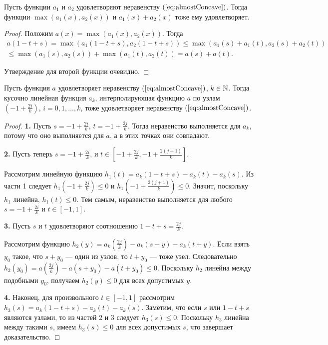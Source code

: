 \begin{lm}
\label{lm:weight_max_sum_concave}
Пусть функции $a_1$ и $a_2$ удовлетворяют неравенству $(\ref{eq:almostConcave})$.
Тогда функции $\max (a_1(x), a_2(x))$ и $a_1(x) + a_2(x)$ тоже ему удовлетворяет.
\end{lm}
\begin{proof}
Положим $a(x) = \max (a_1(x), a_2(x))$.
Тогда
\begin{multline*}
a(1 - t + s) = \max(a_1( 1 - t + s), a_2(1 - t + s)) \le
\max(a_1(s) + a_1(t), a_2(s) + a_2(t)) \\
\le \max(a_1(s), a_2(s)) + \max(a_1(t), a_2(t)) =
a(s) + a(t).
\end{multline*}

Утверждение для второй функции очевидно.
\end{proof}

\begin{lm}
\label{lm:weight_piecewise_linear_concave}
Пусть функция $a$ удовлетворяет неравенству $(\ref{eq:almostConcave})$, $k \in \mathbb N$.
Тогда кусочно линейная функция $a_k$, интерполирующая функцию $a$ по узлам
$(-1 + \frac{2i}{k})$, $i = 0, 1, \dots, k$, тоже удовлетворяет неравенству $(\ref{eq:almostConcave})$.
\end{lm}
\begin{proof}
\textbf{1.}
Пусть $s = -1 + \frac{2i}{k}$, $t = -1 + \frac{2j}{k}$.
Тогда неравенство выполняется для $a_k$, потому что оно выполняется для $a$,
а в этих точках они совпадают.

\textbf{2.}
Пусть теперь $s = -1 + \frac{2i}{k}$, и $t \in [-1 + \frac{2j}{k}, -1 + \frac{2(j + 1)}{k}]$.

Рассмотрим линейную функцию $h_1(t) = a_k( 1 - t + s ) - a_k(t) - a_k(s)$.
Из части 1 следует $h_1(-1 + \frac{2j}{k}) \le 0$ и $h_1(-1 + \frac{2(j + 1)}{k}) \le 0$.
Значит, поскольку $h_1$ линейна, $h_1(t) \le 0$.
Тем самым, неравенство выполняется для любого $s = -1 + \frac{2i}{k}$ и $t \in [-1, 1]$.

\textbf{3.}
Пусть $s$ и $t$ удовлетворяют соотношению $1 - t + s = \frac{2j}{k}$.

Рассмотрим функцию $h_2(y) = a_k(\frac{2j}{k}) - a_k(s + y) - a_k(t + y)$.
Если взять $y_0$ такое, что $s + y_0$ --- один из узлов, то $t + y_0$ --- тоже узел.
Следовательно $h_2(y_0) = a(\frac{2j}{k}) - a(s + y_0) - a(t + y_0) \le 0$.
Поскольку $h_2$ линейна между подобными $y_0$, получаем $h_2(y) \le 0$ для всех допустимых $y$.

\textbf{4.}
Наконец, для произвольного $t \in [-1, 1]$ рассмотрим $h_3(s) = a_k( 1 - t + s ) - a_k(t) - a_k(s)$.
Заметим, что если $s$ или $1 - t + s$ являются узлами, то из частей 2 и 3 следует $h_3(s) \le 0$.
Поскольку $h_3$ линейна между такими $s$, имеем $h_3(s) \le 0$ для всех допустимых $s$, что завершает доказательство.
\end{proof}
